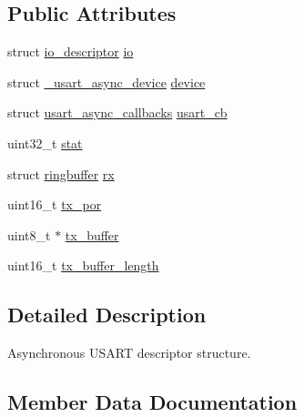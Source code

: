 \subsection*{Public Attributes}
\begin{DoxyCompactItemize}
\item 
struct \hyperlink{structio__descriptor}{io\+\_\+descriptor} \hyperlink{structusart__async__descriptor_a0b567a552bb9024872536444202911f3}{io}
\item 
struct \hyperlink{struct__usart__async__device}{\+\_\+usart\+\_\+async\+\_\+device} \hyperlink{structusart__async__descriptor_a48ab054cada0897a439c0889ff769bbf}{device}
\item 
struct \hyperlink{structusart__async__callbacks}{usart\+\_\+async\+\_\+callbacks} \hyperlink{structusart__async__descriptor_a84b19b1c19b845d0c2870ab306955b91}{usart\+\_\+cb}
\item 
uint32\+\_\+t \hyperlink{structusart__async__descriptor_aa3b7aeba241416b7061e967d7832b203}{stat}
\item 
struct \hyperlink{structringbuffer}{ringbuffer} \hyperlink{structusart__async__descriptor_a36cb240b43ed5ac70fb4b3cca1bcd071}{rx}
\item 
uint16\+\_\+t \hyperlink{structusart__async__descriptor_aecbbb71691ffede25d2ec628947a4305}{tx\+\_\+por}
\item 
uint8\+\_\+t $\ast$ \hyperlink{structusart__async__descriptor_a9ed199abede0cb07c2b91aeb443d3ada}{tx\+\_\+buffer}
\item 
uint16\+\_\+t \hyperlink{structusart__async__descriptor_a0a4c5301c869bb18cb57deb866707e66}{tx\+\_\+buffer\+\_\+length}
\end{DoxyCompactItemize}


\subsection{Detailed Description}
Asynchronous U\+S\+A\+RT descriptor structure. 

\subsection{Member Data Documentation}
\mbox{\label{structusart__async__descriptor_a48ab054cada0897a439c0889ff769bbf}} 
